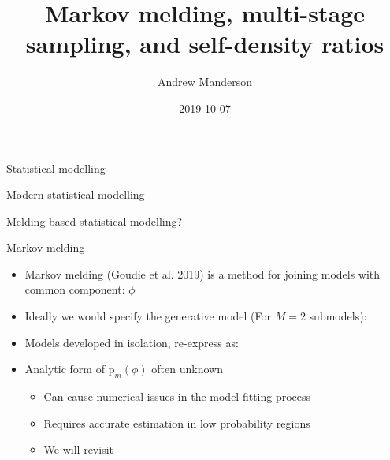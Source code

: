 \documentclass[10pt,ignorenonframetext,]{beamer}
\title{Markov melding, multi-stage sampling, and self-density ratios}
\author{Andrew Manderson}
\date{2019-10-07}
\providecommand{\tightlist}{%
  \setlength{\itemsep}{0pt}\setlength{\parskip}{0pt}}
\newcommand{\pd}{\text{p}}
\newcommand{\modelindex}{m}
\begin{document}
\frame{\titlepage}

\begin{frame}{Statistical modelling}



\end{frame}

\begin{frame}{Modern statistical modelling}



\end{frame}

\begin{frame}{Melding based statistical modelling?}



\end{frame}

\begin{frame}{Markov melding}

\begin{itemize}
\tightlist
\item
  Markov melding (Goudie et al. 2019) is a method for joining models
  with common component: \(\phi\)
\item
  Ideally we would specify the generative model (For \(M = 2\)
  submodels): 
\item
  Models developed in isolation, re-express as:
  
\item
  Analytic form of \(\pd_{\modelindex}(\phi)\) often unknown

  \begin{itemize}
  \tightlist
  \item
    Can cause numerical issues in the model fitting process
  \item
    Requires accurate estimation in low probability regions\\
  \item
    We will revisit
  \end{itemize}
\end{itemize}

\end{frame}
\end{document}
